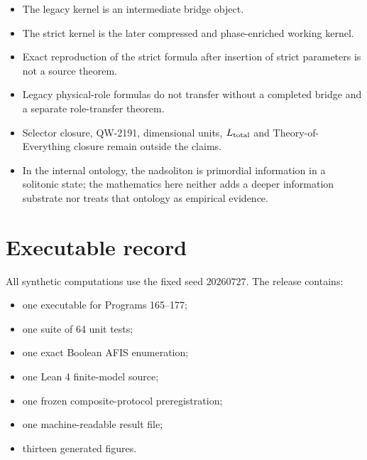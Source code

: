 \documentclass[11pt,a4paper,openany]{report}
\begin{document}
\begin{itemize}
\item 
The legacy kernel is an intermediate bridge object.

\item 
The strict kernel is the later compressed and phase-enriched working kernel.

\item 
Exact reproduction of the strict formula after insertion of strict parameters is not a source theorem.

\item 
Legacy physical-role formulas do not transfer without a completed bridge and a separate role-transfer theorem.

\item 
Selector closure, QW-2191, dimensional units, \(L_{\rm total}\) and Theory-of-Everything closure remain outside the claims.

\item 
In the internal ontology, the nadsoliton is primordial information in a solitonic state; the mathematics here neither adds a deeper information substrate nor treats that ontology as empirical evidence.

\end{itemize}

\section{Executable record}

All synthetic computations use the fixed seed \(20260727\). The release contains:

\begin{itemize}
\item 
one executable for Programs 165--177;

\item 
one suite of 64 unit tests;

\item 
one exact Boolean AFIS enumeration;

\item 
one Lean 4 finite-model source;

\item 
one frozen composite-protocol preregistration;

\item 
one machine-readable result file;

\item 
thirteen generated figures.

\end{itemize}
\end{document}
